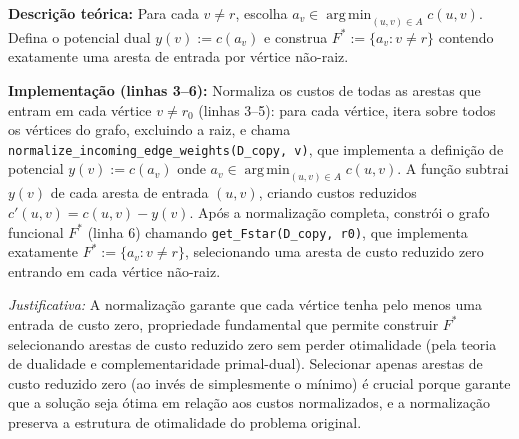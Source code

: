 \begin{tcolorbox}[
        enhanced, breakable,
        colframe=green!60!black, colback=green!5,
        colbacktitle=green!20, coltitle=black,
        title={Passo 2: Normalização e construção de $F^*$},
        boxed title style={sharp corners, boxrule=0.6pt},
        sharp corners, boxrule=0.6pt
    ]
    \textbf{Descrição teórica:} Para cada \(v\neq r\), escolha \(a_v\in\mathop{\mathrm{arg\,min}}_{(u,v)\in A} c(u,v)\). Defina o potencial dual \(y(v):=c(a_v)\) e construa \(F^*:=\{a_v : v\neq r\}\) contendo exatamente uma aresta de entrada por vértice não-raiz.

    \tcblower

    \textbf{Implementação (linhas 3--6):} Normaliza os custos de todas as arestas que entram em cada vértice \(v \neq r_0\) (linhas 3--5): para cada vértice, itera sobre todos os vértices do grafo, excluindo a raiz, e chama \texttt{normalize\_incoming\_edge\_weights(D\_copy, v)}, que implementa a definição de potencial \(y(v):=c(a_v)\) onde \(a_v\in\mathop{\mathrm{arg\,min}}_{(u,v)\in A} c(u,v)\). A função subtrai \(y(v)\) de cada aresta de entrada \((u,v)\), criando custos reduzidos \(c'(u,v)=c(u,v)-y(v)\). Após a normalização completa, constrói o grafo funcional \(F^*\) (linha 6) chamando \texttt{get\_Fstar(D\_copy, r0)}, que implementa exatamente \(F^*:=\{a_v : v\neq r\}\), selecionando uma aresta de custo reduzido zero entrando em cada vértice não-raiz.

    \emph{Justificativa:} A normalização garante que cada vértice tenha pelo menos uma entrada de custo zero, propriedade fundamental que permite construir \(F^*\) selecionando arestas de custo reduzido zero sem perder otimalidade (pela teoria de dualidade e complementaridade primal-dual). Selecionar apenas arestas de custo reduzido zero (ao invés de simplesmente o mínimo) é crucial porque garante que a solução seja ótima em relação aos custos normalizados, e a normalização preserva a estrutura de otimalidade do problema original.
\end{tcolorbox}

